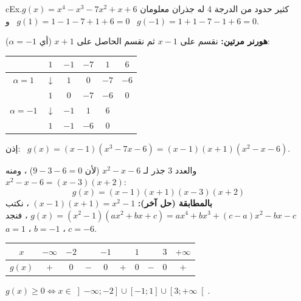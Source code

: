 \documentclass[12pt,a4paper]{article}
\newenvironment{LTR}{\begin{otherlanguage}{english}}{\end{otherlanguage}}
\begin{document}
\begin{otherlanguage}{english}\begin{arbox}[breakable]{cEx}{كثير حدود من الدرجة 4 له جذران معلومان}
$g(x)=x^4-x^3-7x^2+x+6$. \quad $g(1)=1-1-7+1+6=0$ \ و \ $g(-1)=1+1-7-1+6=0$.\par
\textbf{هورنر مرتين:} نقسم على $x-1$ ثم نقسم الحاصل على $x+1$ (أي $\alpha=-1$):
\begin{center}
\begin{LTR}
\renewcommand{\arraystretch}{1.5}
\begin{tabular}{|c|c|c|c|c|c|}\hline
\cellcolor{cDef!15} & \cellcolor{cDef!15}$1$ & \cellcolor{cDef!15}$-1$ & \cellcolor{cDef!15}$-7$ & \cellcolor{cDef!15}$1$ & \cellcolor{cDef!15}$6$\\\hline
\cellcolor{cEx!25}$\alpha=1$ & $\downarrow$ & $1$ & $0$ & $-7$ & $-6$\\\hline
 & \cellcolor{cSol!15}$1$ & \cellcolor{cSol!15}$0$ & \cellcolor{cSol!15}$-7$ & \cellcolor{cSol!15}$-6$ & \cellcolor{cThm!20}$0$\\\hline
\cellcolor{cEx!25}$\alpha=-1$ & $\downarrow$ & $-1$ & $1$ & $6$ & \\\hline
 & \cellcolor{cSol!15}$1$ & \cellcolor{cSol!15}$-1$ & \cellcolor{cSol!15}$-6$ & \cellcolor{cThm!20}$0$ & \\\hline
\end{tabular}
\end{LTR}
\end{center}
إذن: \ $g(x)=(x-1)\left(x^3-7x-6\right)=(x-1)(x+1)\left(x^2-x-6\right)$.\par
والعدد $3$ جذر لـ $x^2-x-6$ (لأن $9-3-6=0$) ، ومنه $x^2-x-6=(x-3)(x+2)$:
\[\boxed{g(x)=(x-1)(x+1)(x-3)(x+2)}\]
\textbf{بالمطابقة (حل آخر):} $(x-1)(x+1)=x^2-1$ ، نكتب $g(x)=\left(x^2-1\right)\left(ax^2+bx+c\right)=ax^4+bx^3+(c-a)x^2-bx-c$ ، فنجد $a=1$ ، $b=-1$ ، $c=-6$.
\begin{center}
\renewcommand{\arraystretch}{1.4}
\begin{tabular}{|C|C|C|C|C|C|C|C|C|C|}\hline
{}$x$ & $-\infty$ \quad & $-2$ & & $-1$ & & $1$ & & $3$ & \quad $+\infty$\\\hline
$g(x)$ & $+$ & $0$ & $-$ & $0$ & $+$ & $0$ & $-$ & $0$ & $+$\\\hline
\end{tabular}
\end{center}
$g(x)\ge0\iff x\in\left]-\infty;-2\right]\cup\left[-1;1\right]\cup\left[3;+\infty\right[$.
\end{arbox}\end{otherlanguage}
\end{document}
